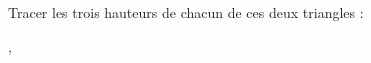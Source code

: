 
\begin{exercice}\label{exosmath-0928}

Tracer les trois hauteurs de chacun de ces deux triangles :
\begin{center}
   ,
   
\end{center}

\end{exercice}

